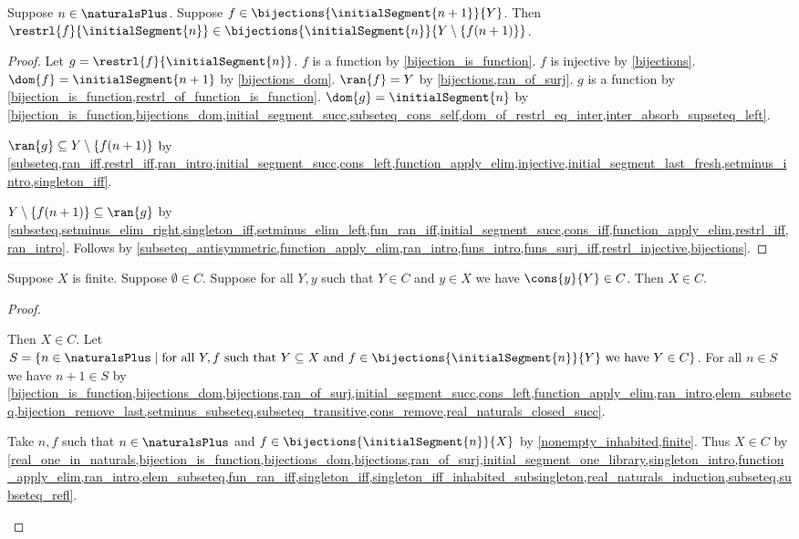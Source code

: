 \begin{lemma}\label{bijection_remove_last}
    Suppose $n\in\naturalsPlus$.
    Suppose $f\in\bijections{\initialSegment{n+1}}{Y}$.
    Then $\restrl{f}{\initialSegment{n}}\in\bijections{\initialSegment{n}}{Y\setminus\{f(n+1)\}}$.
\end{lemma}
\begin{proof}
    Let $g=\restrl{f}{\initialSegment{n}}$.
    $f$ is a function by \cref{bijection_is_function}.
    $f$ is injective by \cref{bijections}.
    $\dom{f}=\initialSegment{n+1}$ by \cref{bijections_dom}.
    $\ran{f}=Y$ by \cref{bijections,ran_of_surj}.
    $g$ is a function by \cref{bijection_is_function,restrl_of_function_is_function}.
    $\dom{g}=\initialSegment{n}$ by \cref{bijection_is_function,bijections_dom,initial_segment_succ,subseteq_cons_self,dom_of_restrl_eq_inter,inter_absorb_supseteq_left}.

    $\ran{g}\subseteq Y\setminus\{f(n+1)\}$ by \cref{subseteq,ran_iff,restrl_iff,ran_intro,initial_segment_succ,cons_left,function_apply_elim,injective,initial_segment_last_fresh,setminus_intro,singleton_iff}.

    $Y\setminus\{f(n+1)\}\subseteq\ran{g}$ by \cref{subseteq,setminus_elim_right,singleton_iff,setminus_elim_left,fun_ran_iff,initial_segment_succ,cons_iff,function_apply_elim,restrl_iff,ran_intro}.
    Follows by \cref{subseteq_antisymmetric,function_apply_elim,ran_intro,funs_intro,funs_surj_iff,restrl_injective,bijections}.
\end{proof}

\begin{lemma}\label{finite_induction}
    Suppose $X$ is finite.
    Suppose $\emptyset\in C$.
    Suppose for all $Y,y$ such that $Y\in C$ and $y\in X$ we have $\cons{y}{Y}\in C$.
    Then $X\in C$.
\end{lemma}
\begin{proof}
    \begin{byCase}
        Then $X\in C$.
        Let $S=\{n\in\naturalsPlus\mid \text{for all $Y,f$ such that $Y\subseteq X$ and $f\in\bijections{\initialSegment{n}}{Y}$ we have $Y\in C$}\}$.
        For all $n\in S$ we have $n+1\in S$ by \cref{bijection_is_function,bijections_dom,bijections,ran_of_surj,initial_segment_succ,cons_left,function_apply_elim,ran_intro,elem_subseteq,bijection_remove_last,setminus_subseteq,subseteq_transitive,cons_remove,real_naturals_closed_succ}.

        Take $n,f$ such that $n\in\naturalsPlus$ and $f\in\bijections{\initialSegment{n}}{X}$ by \cref{nonempty_inhabited,finite}.
        Thus $X\in C$ by \cref{real_one_in_naturals,bijection_is_function,bijections_dom,bijections,ran_of_surj,initial_segment_one_library,singleton_intro,function_apply_elim,ran_intro,elem_subseteq,fun_ran_iff,singleton_iff,singleton_iff_inhabited_subsingleton,real_naturals_induction,subseteq,subseteq_refl}.
    \end{byCase}
\end{proof}

